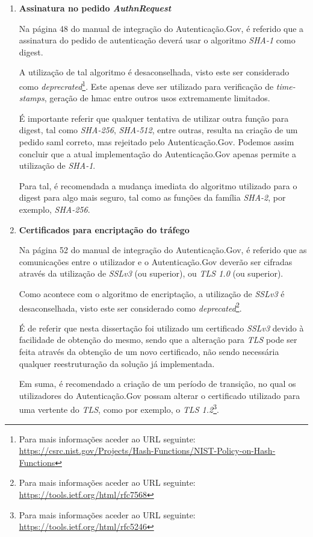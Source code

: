 \begin{enumerate}
    \item \textbf{Assinatura no pedido \emph{AuthnRequest}}
    
    Na página 48 do manual de integração do Autenticação.Gov\cite{manualAuthGov}, é referido que a assinatura do pedido de autenticação deverá usar o algoritmo \emph{SHA-1} como digest.
    
    A utilização de tal algoritmo é desaconselhada, visto este ser considerado como \emph{deprecrated}\footnote{Para mais informações aceder ao URL seguinte:  \url{https://csrc.nist.gov/Projects/Hash-Functions/NIST-Policy-on-Hash-Functions}}. Este apenas deve ser utilizado para verificação de \emph{time-stamps}, geração de \gls{hmac} entre outros usos extremamente limitados.
    
    É importante referir que qualquer tentativa de utilizar outra função para digest, tal como \emph{SHA-256}, \emph{SHA-512}, entre outras, resulta na criação de um pedido \gls{saml} correto, mas rejeitado pelo Autenticação.Gov. Podemos assim concluir que a atual implementação do Autenticação.Gov apenas permite a utilização de \emph{SHA-1}.
    
    Para tal, é recomendada a mudança imediata do algoritmo utilizado para o digest para algo mais seguro, tal como as funções da família \emph{SHA-2}, por exemplo, \emph{SHA-256}.
    
    \item \textbf{Certificados para encriptação do tráfego}
    
    Na página 52 do manual de integração do Autenticação.Gov\cite{manualAuthGov}, é referido que as comunicações entre o utilizador e o Autenticação.Gov deverão ser cifradas através da utilização de \emph{SSLv3} (ou superior), ou \emph{TLS 1.0} (ou superior).
    
    Como acontece com o algoritmo de encriptação, a utilização de \emph{SSLv3} é desaconselhada, visto este ser considerado como \emph{deprecated}\footnote{Para mais informações aceder ao URL seguinte:  \url{https://tools.ietf.org/html/rfc7568}}.
    
    É de referir que nesta dissertação foi utilizado um certificado \emph{SSLv3} devido à facilidade de obtenção do mesmo, sendo que a alteração para \emph{TLS} pode ser feita através da obtenção de um novo certificado, não sendo necessária qualquer reestruturação da solução já implementada.
    
    Em suma, é recomendado a criação de um período de transição, no qual os utilizadores do Autenticação.Gov possam alterar o certificado utilizado para uma vertente do \emph{TLS}, como por exemplo, o \emph{TLS 1.2}\footnote{Para mais informações aceder ao URL seguinte: \url{https://tools.ietf.org/html/rfc5246}}.
\end{enumerate}

